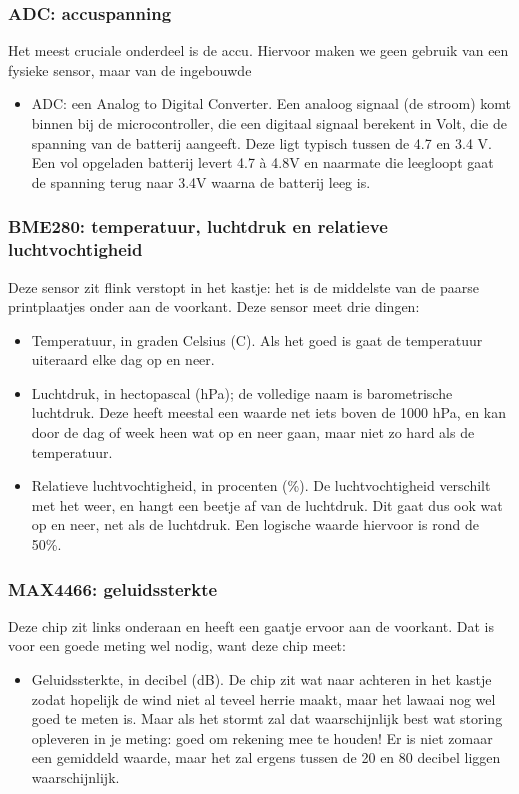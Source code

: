 \documentclass[a4paper,11pt, fleqn]{article}
\begin{document}
\subsubsection{ADC: accuspanning}
Het meest cruciale onderdeel is de accu. Hiervoor maken we geen gebruik van een fysieke sensor, maar van de ingebouwde
\begin{itemize}
	\item[0)] ADC: een Analog to Digital Converter. Een analoog signaal (de stroom) komt binnen bij de microcontroller, die een digitaal signaal berekent in Volt, die de spanning van de batterij aangeeft. Deze ligt typisch tussen de 4.7 en 3.4 V. Een vol opgeladen batterij levert 4.7 \`a 4.8V en naarmate die leegloopt gaat de spanning terug naar 3.4V waarna de batterij leeg is.
\end{itemize}

\subsubsection{BME280: temperatuur, luchtdruk en relatieve luchtvochtigheid}
Deze sensor zit flink verstopt in het kastje: het is de middelste van de paarse printplaatjes onder aan de voorkant. Deze sensor meet drie dingen:
\begin{itemize}
	\item[1)] Temperatuur, in graden Celsius (\textdegree C). Als het goed is gaat de temperatuur uiteraard elke dag op en neer.
	\item[2)] Luchtdruk, in hectopascal (hPa); de volledige naam is barometrische luchtdruk. Deze heeft meestal een waarde net iets boven de 1000 hPa, en kan door de dag of week heen wat op en neer gaan, maar niet zo hard als de temperatuur.
	\item[3)] Relatieve luchtvochtigheid, in procenten (\%). De luchtvochtigheid verschilt met het weer, en hangt een beetje af van de luchtdruk. Dit gaat dus ook wat op en neer, net als de luchtdruk. Een logische waarde hiervoor is rond de 50\%.
\end{itemize}

\subsubsection{MAX4466: geluidssterkte}
Deze chip zit links onderaan en heeft een gaatje ervoor aan de voorkant. Dat is voor een goede meting wel nodig, want deze chip meet:
\begin{itemize}
	\item[4)] Geluidssterkte, in decibel (dB). De chip zit wat naar achteren in het kastje zodat hopelijk de wind niet al teveel herrie maakt, maar het lawaai nog wel goed te meten is. Maar als het stormt zal dat waarschijnlijk best wat storing opleveren in je meting: goed om rekening mee te houden! Er is niet zomaar een gemiddeld waarde, maar het zal ergens tussen de 20 en 80 decibel liggen waarschijnlijk.
\end{itemize}
\end{document}
